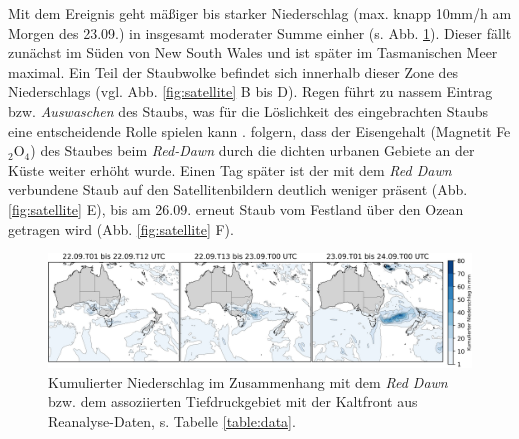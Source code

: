 \documentclass[12pt,a4paper,onecolumn]{scrartcl}
\begin{document}
Mit dem Ereignis geht mäßiger bis starker Niederschlag (max. knapp 10mm/h am Morgen des 23.09.) in insgesamt moderater Summe einher (s. Abb. \ref{fig:rain}). Dieser fällt zunächst im Süden von New South Wales und ist später im Tasmanischen Meer maximal. Ein Teil der Staubwolke befindet sich innerhalb dieser Zone des Niederschlags (vgl. Abb. \ref{fig:satellite} B bis D). Regen führt zu nassem Eintrag bzw. \textit{Auswaschen} des Staubs, was  für die Löslichkeit des eingebrachten Staubs eine entscheidende Rolle spielen kann \citep{Shao.2011}. \citet{Reynolds.2014} folgern, dass der Eisengehalt (Magnetit Fe$_2$O$_4$) des Staubes beim \textit{Red-Dawn} durch die dichten urbanen Gebiete an der Küste weiter erhöht wurde. Einen Tag später ist der mit dem \textit{Red Dawn} verbundene Staub auf den Satellitenbildern deutlich weniger präsent (Abb. \ref{fig:satellite} E), bis am 26.09. erneut Staub vom Festland über den Ozean getragen wird (Abb. \ref{fig:satellite} F).
\begin{figure}[!htb]
\includegraphics[width=\textwidth]{bilder/reddawn/rain.png}
\caption{Kumulierter Niederschlag im Zusammenhang mit dem \textit{Red Dawn} bzw. dem assoziierten Tiefdruckgebiet mit der Kaltfront aus Reanalyse-Daten, s. Tabelle \ref{table:data}.} \label{fig:rain}
\end{figure}
\end{document}
